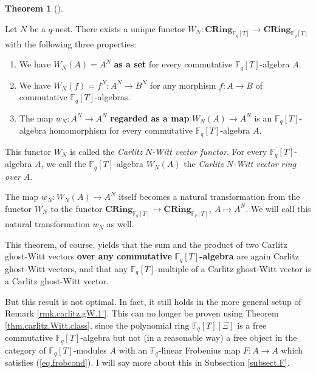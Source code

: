 \documentclass[numbers=enddot,12pt,final,onecolumn,notitlepage]{scrartcl}%
\theoremstyle{definition}
\newtheorem{theo}{Theorem}[section]
\newenvironment{theorem}[1][]
{\begin{theo}[#1]\begin{leftbar}}
{\end{leftbar}\end{theo}}
\begin{document}
\begin{theorem}
\label{thm.carlitz.Witt.class}Let $N$ be a $q$-nest. There exists a unique
functor $W_{N}:\mathbf{CRing}_{\mathbb{F}_{q}\left[  T\right]  }%
\rightarrow\mathbf{CRing}_{\mathbb{F}_{q}\left[  T\right]  }$ with the
following three properties:

\begin{enumerate}
\item We have $W_{N}\left(  A\right)  =A^{N}$ \textbf{as a set} for every
commutative $\mathbb{F}_{q}\left[  T\right]  $-algebra $A$.

\item We have $W_{N}\left(  f\right)  =f^{N}:A^{N}\rightarrow B^{N}$ for any
morphism $f:A\rightarrow B$ of commutative $\mathbb{F}_{q}\left[  T\right]  $-algebras.

\item The map $w_{N}:A^{N}\rightarrow A^{N}$ \textbf{regarded as a map }%
$W_{N}\left(  A\right)  \rightarrow A^{N}$ is an $\mathbb{F}_{q}\left[
T\right]  $-algebra homomorphism for every commutative $\mathbb{F}_{q}\left[
T\right]  $-algebra $A$.
\end{enumerate}

This functor $W_{N}$ is called the \textit{Carlitz }$N$\textit{-Witt vector
functor}. For every $\mathbb{F}_{q}\left[  T\right]  $-algebra $A$, we call
the $\mathbb{F}_{q}\left[  T\right]  $-algebra $W_{N}\left(  A\right)  $ the
\textit{Carlitz }$N$\textit{-Witt vector ring over }$A$.

The map $w_{N}:W_{N}\left(  A\right)  \rightarrow A^{N}$ itself becomes a
natural transformation from the functor $W_{N}$ to the functor $\mathbf{CRing}%
_{\mathbb{F}_{q}\left[  T\right]  }\rightarrow\mathbf{CRing}_{\mathbb{F}%
_{q}\left[  T\right]  },\ A\mapsto A^{N}$. We will call this natural
transformation $w_{N}$ as well.
\end{theorem}

This theorem, of course, yields that the sum and the product of two Carlitz
ghost-Witt vectors \textbf{over any commutative }$\mathbb{F}_{q}\left[
T\right]  $\textbf{-algebra} are again Carlitz ghost-Witt vectors, and that
any $\mathbb{F}_{q}\left[  T\right]  $-multiple of a Carlitz ghost-Witt vector
is a Carlitz ghost-Witt vector.

But this result is not optimal. In fact, it still holds in the more general
setup of Remark \ref{rmk.carlitz.gW.1'}. This can no longer be proven using
Theorem \ref{thm.carlitz.Witt.class}, since the polynomial ring $\mathbb{F}%
_{q}\left[  T\right]  \left[  \Xi\right]  $ is a free commutative
$\mathbb{F}_{q}\left[  T\right]  $-algebra but not (in a reasonable way) a
free object in the category of $\mathbb{F}_{q}\left[  T\right]  $-modules $A$
with an $\mathbb{F}_{q}$-linear Frobenius map $F:A\rightarrow A$ which
satisfies (\ref{eq.frobcond}). I will say more about this in Subsection
\ref{subsect.F}.
\end{document}
